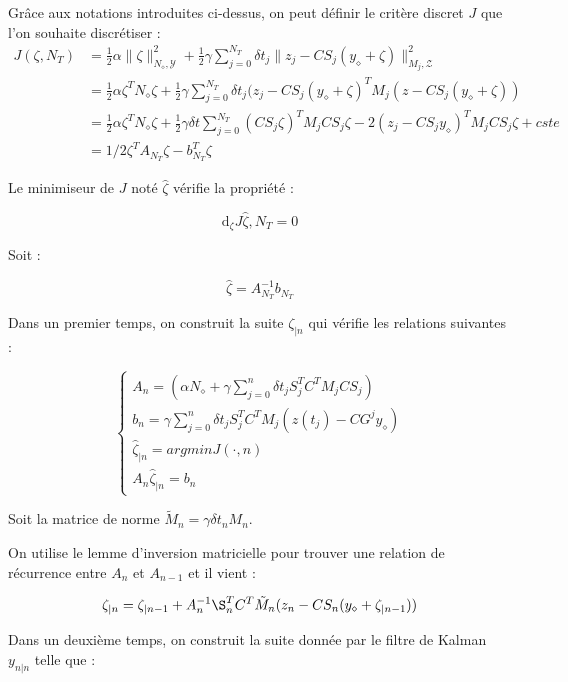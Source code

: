 \documentclass[a4paper]{article}
\begin{document}
Grâce aux notations introduites ci-dessus, on peut définir le critère discret $J$ que l'on souhaite discrétiser :
\[
\begin{split}
    J(\zeta,N_T) &= \frac{1}{2}\alpha \parallel \zeta \parallel _{N_{\diamond},\mathscr{Y}}^2 + \frac{1}{2}\gamma \sum_{j=0}^{N_T} \delta t_j \parallel z_j - CS_j(y_{\diamond}+\zeta) \parallel_{M_j,\mathscr{Z}}^2 \\
	                 &= \frac{1}{2}\alpha \zeta ^T N_{\diamond} \zeta + \frac{1}{2}\gamma \sum_{j=0}^{N_T} \delta t_j (z_j - CS_j(y_{\diamond}+\zeta)^T M_j (z - CS_j(y_{\diamond}+\zeta))\\
					 &=  \frac{1}{2}\alpha \zeta ^T N_{\diamond} \zeta + \frac{1}{2}\gamma \delta t \sum_{j=0}^{N_T} (C S_j\zeta)^T M_jCS_j\zeta
			            -2(z_j-CS_jy_{\diamond})^TM_jCS_j \zeta + cste\\
					 &= 1/2 \zeta^T A_{N_T} \zeta - b_{N_T}^T\zeta
\end{split}
\]

Le minimiseur de $J$ noté $\hat{\zeta}$ vérifie la propriété :

\[
\mathrm{d}_{\zeta} J{\hat{\zeta},N_T} = 0
\]

Soit :

\[ \hat{\zeta}= A_{N_T}^{-1} b_{N_T} \]

Dans un premier temps, on construit la suite $\zeta_{|n}$ qui vérifie les relations suivantes :

\begin{equation}
	\begin{cases}
		\displaystyle A_n = (\alpha N_{\diamond} + \gamma  \sum_{j=0}^{n}\delta t_j S_j^TC^TM_jCS_j)\\
		b_n = \gamma \sum_{j=0}^{n} \delta t_j  S_j^T C^T M_j(z(t_j)-CG^jy_{\diamond}) \\
		\hat{\zeta}_{|n} = argmin J(\cdot,n) \\
		A_n \hat{\zeta}_{|n} = b_n
	\end{cases}
\end{equation}


Soit la matrice de norme $\tilde{M}_n= \gamma \delta t_n M_n$.


On utilise le lemme d'inversion matricielle pour trouver une relation de récurrence entre $A_n$ et $A_{n-1}$ et il vient :

\[\zeta_{|n} = \zeta_{|n-1} + A_{n}^{-1} \S_n^T C^T \tilde{M}_n (z_n- C S_n (y_{\diamond} + \zeta_{|n-1}) ) \]

Dans un deuxième temps, on construit la suite donnée par le filtre de Kalman $y_{n|n}$ telle que :
\end{document}

